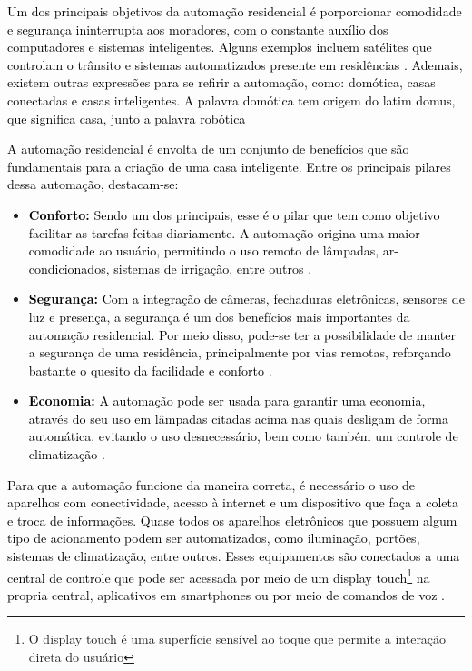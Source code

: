     \textcolor{black}{Um dos principais objetivos da automação residencial é porporcionar comodidade e segurança ininterrupta aos moradores, com o constante auxílio dos computadores e sistemas inteligentes. Alguns exemplos incluem satélites que controlam o trânsito e sistemas automatizados presente em residências \cite{algunsAspectos}. Ademais, existem outras expressões para se refirir a automação, como: domótica, casas conectadas e casas inteligentes. A palavra domótica tem origem do latim domus, que significa casa, junto a palavra robótica \cite{automacaoTecnologiaPraticidade}}

    \textcolor{black}{A automação residencial é envolta de um conjunto de benefícios que são fundamentais para a criação de uma casa inteligente. Entre os principais pilares dessa automação, destacam-se:}

    \begin{itemize}
        \item \textbf{\textcolor{black}{Conforto:}} \textcolor{black}{Sendo um dos principais, esse é o pilar que tem como objetivo facilitar as tarefas feitas diariamente. A automação origina uma maior comodidade ao usuário, permitindo o uso remoto de lâmpadas, ar-condicionados, sistemas de irrigação, entre outros \cite{automacaoTecnologiaPraticidade}.}
        
        \item \textbf{\textcolor{black}{Segurança:}} \textcolor{black}{Com a integração de câmeras, fechaduras eletrônicas, sensores de luz e presença, a segurança é um dos benefícios mais importantes da automação residencial. Por meio disso, pode-se ter a possibilidade de manter a segurança de uma residência, principalmente por vias remotas, reforçando bastante o quesito da facilidade e conforto \cite{automacaoTecnologiaPraticidade}.}
        
        \item \textbf{\textcolor{black}{Economia:}} \textcolor{black}{A automação pode ser usada para garantir uma economia, através do seu uso em lâmpadas citadas acima nas quais desligam de forma automática, evitando o uso desnecessário, bem como também um controle de climatização \cite{automacaoTecnologiaPraticidade}.}
        
    \end{itemize}

    \textcolor{black}{Para que a automação funcione da maneira correta, é necessário o uso de aparelhos com conectividade, acesso à internet e um dispositivo que faça a coleta e troca de informações. Quase todos os aparelhos eletrônicos que possuem algum tipo de acionamento podem ser automatizados, como iluminação, portões, sistemas de climatização, entre outros. Esses equipamentos são conectados a uma central de controle que pode ser acessada por meio de um display touch\footnote{O display touch é uma superfície sensível ao toque que permite a interação direta do usuário} na propria central, aplicativos em smartphones ou por meio de comandos de voz \cite{automacaoTecnologiaPraticidade}.}

